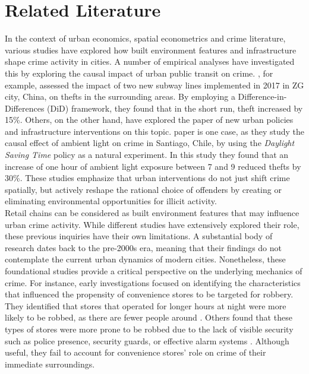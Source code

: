\documentclass[12pt]{article}
\begin{document}
\section{Related Literature}
\label{sec:Literature}


In the context of urban economics, spatial econometrics and crime literature, various studies have explored how built environment features and infrastructure shape crime activity in cities. A number of empirical analyses have investigated this by exploring the causal impact of urban public transit on crime.  \textcite{ijgi10100632}, for example, assessed the impact of two new subway lines implemented in 2017 in ZG city, China, on thefts in the surrounding areas. By employing a Difference-in-Differences (DiD) framework, they found that in the short run, theft increased by 15\%. Others, on the other hand, have explored the paper of new urban policies and infrastructure interventions on this topic. \textcite{dominguez2022crimetime} paper is one case, as they study the causal effect of ambient light on crime in Santiago, Chile, by using the \textit{Daylight Saving Time} policy as a natural experiment. In this study they found that an increase of one hour of ambient light exposure between 7 and 9 reduced thefts by 30\%. These studies emphasize that urban interventions do not just shift crime spatially, but actively reshape the rational choice of offenders by creating or eliminating environmental opportunities for illicit activity.\\

Retail chains can be considered as built environment features that may influence urban crime activity. While different studies have extensively explored their role, these previous inquiries have their own limitations. A substantial body of research dates back to the pre-2000s era, meaning that their findings do not contemplate the current urban dynamics of modern cities. Nonetheless, these foundational studies provide a critical perspective on the underlying mechanics of crime. For instance, early investigations focused on identifying the characteristics that influenced the propensity of convenience stores to be targeted for robbery. They identified that stores that operated for longer hours at night were more likely to be robbed, as there are fewer people around \parencite{dalessio1990crime}. Others found that these types of stores were more prone to be robbed due to the lack of visible security such as police presence, security guards, or effective alarm systems \parencite{Wellford1997, Dugato2026}. Although useful, they fail to account for convenience stores’ role on crime of their immediate surroundings.\\
\end{document}
